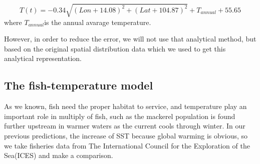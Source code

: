 \documentclass{mcmthesis}
\begin{document}
    \begin{equation}\label{}
      T(t)=-0.34\sqrt{(Lon+14.08)^2+(Lat+104.87)^2}+T_{annual}+55.65      
    \end{equation}
    where $T_{annual}$is the annual avarage temperature.
    \begin{figure}[htbp]
      \centering
      
      \centering
    \end{figure}
    
    However, in order to reduce the error, we will not use that analytical method, but based on the original spatial distribution data which we used to get this analytical representation. 

 \subsection{The fish-temperature model}
  As we known, fish need the proper habitat to service, and temperature play an important role in multiply of fish, such as the mackerel population is found further upstream in warmer waters as the current cools through winter\cite{jansen2012migration}. In our previous predictions, the increase of  SST because global warming is obvious, so we take fisheries data  from The International Council for the Exploration of the Sea(ICES) and make a comparison. 
\end{document}
